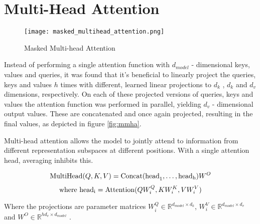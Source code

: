 \section*{Multi-Head Attention}
\label{sec:mlthdatn}

\begin{figure}[!htbp]
    \centering
    \texttt{[image: masked\_multihead\_attention.png]}
    \caption[Masked Multi-head Attention]{Masked Multi-head Attention \cite{2017arXiv170603762V}}
    \label{fig:mmha}
\end{figure}

\hspace{0.5cm} Instead of performing a single attention function with $d_{model}$ - dimensional keys, values and queries, it was found that it's beneficial to linearly project the queries, keys and values $h$ times with different, learned linear projections to $d_k$ , $d_k$ and $d_v$ dimensions, respectively. On each of these projected versions of queries, keys and values the attention function was performed in parallel, yielding $d_v$ - dimensional output values. These are concatenated and once again projected, resulting in the final values, as depicted in figure \eqref{fig:mmha}.

Multi-head attention allows the model to jointly attend to information from different representation
subspaces at different positions. With a single attention head, averaging inhibits this.

\[\textnormal{MultiHead}(Q, K, V) = \textnormal{Concat(head}_1, \hdots, \textnormal{head}_\textnormal{h})W^O \]
\[\textnormal{where head}_\textnormal{i} = \textnormal{Attention}(QW_i^Q, KW_i^K, VW_i^V)\]

Where the projections are parameter matrices $W_i^Q \in \mathbb{R}^{d_{model}\times d_k}$, $W_i^V \in \mathbb{R}^{d_{model}\times d_v}$ and $W^O \in \mathbb{R}^{hd_v\times d_{model}}$ \cite{2017arXiv170603762V}.
\vspace*{\fill}